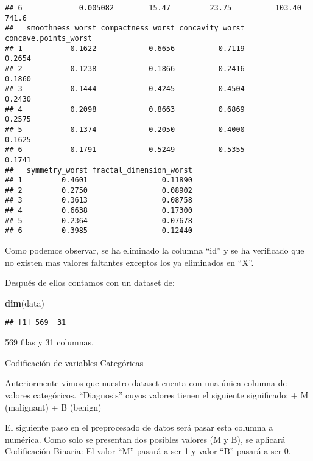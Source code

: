 \documentclass[
]{article}
\newenvironment{Shaded}{\begin{snugshade}}{\end{snugshade}}
\newcommand{\CommentTok}[1]{\textcolor[rgb]{0.56,0.35,0.01}{\textit{#1}}}
\newcommand{\DecValTok}[1]{\textcolor[rgb]{0.00,0.00,0.81}{#1}}
\newcommand{\FunctionTok}[1]{\textcolor[rgb]{0.13,0.29,0.53}{\textbf{#1}}}
\newcommand{\NormalTok}[1]{#1}
\newcommand{\OtherTok}[1]{\textcolor[rgb]{0.56,0.35,0.01}{#1}}
\newcommand{\SpecialCharTok}[1]{\textcolor[rgb]{0.81,0.36,0.00}{\textbf{#1}}}
\newcommand{\StringTok}[1]{\textcolor[rgb]{0.31,0.60,0.02}{#1}}
\begin{document}
\begin{verbatim}
## 6             0.005082        15.47         23.75          103.40      741.6
##   smoothness_worst compactness_worst concavity_worst concave.points_worst
## 1           0.1622            0.6656          0.7119               0.2654
## 2           0.1238            0.1866          0.2416               0.1860
## 3           0.1444            0.4245          0.4504               0.2430
## 4           0.2098            0.8663          0.6869               0.2575
## 5           0.1374            0.2050          0.4000               0.1625
## 6           0.1791            0.5249          0.5355               0.1741
##   symmetry_worst fractal_dimension_worst
## 1         0.4601                 0.11890
## 2         0.2750                 0.08902
## 3         0.3613                 0.08758
## 4         0.6638                 0.17300
## 5         0.2364                 0.07678
## 6         0.3985                 0.12440
\end{verbatim}

Como podemos observar, se ha eliminado la columna ``id'' y se ha
verificado que no existen mas valores faltantes exceptos los ya
eliminados en ``X''.

Después de ellos contamos con un dataset de:

\begin{Shaded}
\begin{Highlighting}[]
\FunctionTok{dim}\NormalTok{(data)}
\end{Highlighting}
\end{Shaded}

\begin{verbatim}
## [1] 569  31
\end{verbatim}

569 filas y 31 columnas.

Codificación de variables Categóricas

Anteriormente vimos que nuestro dataset cuenta con una única columna de
valores categóricos. ``Diagnosis'' cuyos valores tienen el siguiente
significado: + M (malignant) + B (benign)

El siguiente paso en el preprocesado de datos será pasar esta columna a
numérica. Como solo se presentan dos posibles valores (M y B), se
aplicará Codificación Binaria: El valor ``M'' pasará a ser 1 y valor
``B'' pasará a ser 0.

\begin{Shaded}
\end{Shaded}
\end{document}
